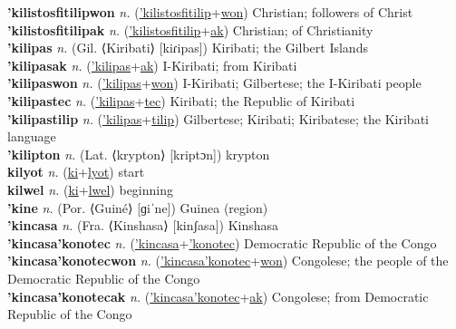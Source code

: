 \textbf{'kilistosfitilipwon} \textit{n.} (\hyperref['kilistosfitilip]{'kilistosfitilip}+\hyperref[won]{won})
Christian; followers of Christ \label{'kilistosfitilipwon} \\
\textbf{'kilistosfitilipak} \textit{n.} (\hyperref['kilistosfitilip]{'kilistosfitilip}+\hyperref[ak]{ak})
Christian; of Christianity \label{'kilistosfitilipak} \\
\textbf{'kilipas} \textit{n.} (Gil. ⟨Kiribati⟩ [kiɾipas])
Kiribati; the Gilbert Islands \label{'kilipas} \\
\textbf{'kilipasak} \textit{n.} (\hyperref['kilipas]{'kilipas}+\hyperref[ak]{ak})
I-Kiribati; from Kiribati \label{'kilipasak} \\
\textbf{'kilipaswon} \textit{n.} (\hyperref['kilipas]{'kilipas}+\hyperref[won]{won})
I-Kiribati; Gilbertese; the I-Kiribati people \label{'kilipaswon} \\
\textbf{'kilipastec} \textit{n.} (\hyperref['kilipas]{'kilipas}+\hyperref[tec]{tec})
Kiribati; the Republic of Kiribati \label{'kilipastec} \\
\textbf{'kilipastilip} \textit{n.} (\hyperref['kilipas]{'kilipas}+\hyperref[tilip]{tilip})
Gilbertese; Kiribati; Kiribatese; the Kiribati language \label{'kilipastilip} \\
\textbf{'kilipton} \textit{n.} (Lat. ⟨krypton⟩ [kriptɔn])
krypton \label{'kilipton} \\
\textbf{kilyot} \textit{n.} (\hyperref[ki]{ki}+\hyperref[lyot]{lyot})
start \label{kilyot} \\
\textbf{kilwel} \textit{n.} (\hyperref[ki]{ki}+\hyperref[lwel]{lwel})
beginning \label{kilwel} \\
\textbf{'kine} \textit{n.} (Por. ⟨Guiné⟩ [ɡiˈne])
Guinea (region) \label{'kine} \\
\textbf{'kincasa} \textit{n.} (Fra. ⟨Kinshasa⟩ [kinʃasa])
Kinshasa \label{'kincasa} \\
\textbf{'kincasa'konotec} \textit{n.} (\hyperref['kincasa]{'kincasa}+\hyperref['konotec]{'konotec})
Democratic Republic of the Congo \label{'kincasa'konotec} \\
\textbf{'kincasa'konotecwon} \textit{n.} (\hyperref['kincasa'konotec]{'kincasa'konotec}+\hyperref[won]{won})
Congolese; the people of the Democratic Republic of the Congo \label{'kincasa'konotecwon} \\
\textbf{'kincasa'konotecak} \textit{n.} (\hyperref['kincasa'konotec]{'kincasa'konotec}+\hyperref[ak]{ak})
Congolese; from Democratic Republic of the Congo \label{'kincasa'konotecak} \\
